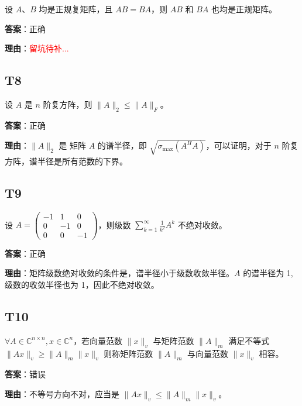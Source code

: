 \documentclass{article}
\begin{document}
\par 设 $A、B$ 均是正规复矩阵，且 $AB=BA$，则 $AB$ 和 $BA$ 也均是正规矩阵。

\par \textbf{答案}：正确

\par \textbf{理由}：\textcolor{red}{留坑待补...}

\subsection{T8}

\par 设 $A$ 是 $n$ 阶复方阵，则 $\|A\|_2\leq \|A\|_F$。

\par \textbf{答案}：正确

\par \textbf{理由}：$\|A\|_2$ 是 矩阵 $A$ 的谱半径，即 $\sqrt{\sigma_{\text{max}}(A^HA)}$，可以证明，对于 $n$ 阶复方阵，谱半径是所有范数的下界。

\subsection{T9}

\par 设 $A=\begin{pmatrix}-1 & 1 & 0\\0 & -1 & 0\\0 & 0 &-1\end{pmatrix}$，则级数 $\sum_{k=1}^{\infty}\frac{1}{k^2}A^k$ 不绝对收敛。

\par \textbf{答案}：正确

\par \textbf{理由}：矩阵级数绝对收敛的条件是，谱半径小于级数收敛半径。$A$ 的谱半径为 1,级数的收敛半径也为 1，因此不绝对收敛。

\subsection{T10}

\par $\forall A\in \mathbb C^{n\times n}, x\in \mathbb C^n$，若向量范数 $\|x\|_v$ 与矩阵范数 $\|A\|_m$ 满足不等式 $\|Ax\|_v\geq \|A\|_m \|x\|_v$ 则称矩阵范数 $\|A\|_m$ 与向量范数 $\|x\|_v$ 相容。

\par \textbf{答案}：错误

\par \textbf{理由}：不等号方向不对，应当是 $\|Ax\|_v\leq \|A\|_m \|x\|_v$。
\end{document}
